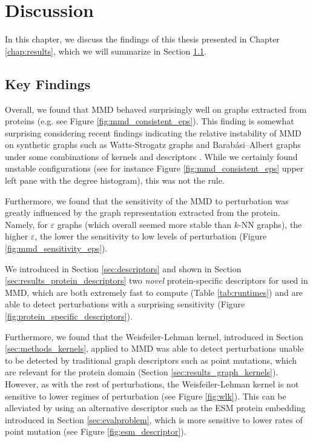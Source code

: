 \chapter{Discussion}\label{chap:discussion}

In this chapter, we discuss the findings of this thesis presented in Chapter
\ref{chap:results}, which we will summarize in Section \ref{sec:key_findings}.

\section{Key Findings}\label{sec:key_findings}

Overall, we found that MMD behaved surprisingly well on graphs extracted from
proteins (e.g. see Figure \ref{fig:mmd_consistent_eps}). This finding is
somewhat surprising considering recent findings indicating the relative
instability of MMD on synthetic graphs such as Watts-Strogatz graphs and
Barabási–Albert graphs under some combinations of kernels and descriptors
\citep{o2021evaluation}. While we certainly found unstable configurations
(see for instance Figure \ref{fig:mmd_consistent_eps} upper left pane with the degree histogram),
this was not the rule.

Furthermore, we found that the sensitivity of the MMD to perturbation was
greatly influenced by the graph representation extracted from the protein.
Namely, for $\varepsilon$ graphs (which overall seemed more stable than $k$-NN
graphs), the higher $\varepsilon$, the lower the sensitivity to low levels of
perturbation (Figure \ref{fig:mmd_sensitivity_eps}).

We introduced in Section \ref{sec:descriptors} and shown in Section
\ref{sec:results_protein_descriptors} two \emph{novel} protein-specific descriptors for
used in MMD, which are both extremely fast to compute (Table \ref{tab:runtimes})
and are able to detect perturbations with a surprising sensitivity (Figure
\ref{fig:protein_specific_descriptors}).

Furthermore, we found that the Weisfeiler-Lehman kernel, introduced in Section
\ref{sec:methods_kernels}, applied to MMD was able to detect perturbations
unable to be detected by traditional graph descriptors such as point mutations,
which are relevant for the protein domain (Section
\ref{sec:results_graph_kernels}). However, as with the rest of perturbations,
the Weisfeiler-Lehman kernel is not sensitive to lower regimes of perturbation
(see Figure \ref{fig:wlk}).
This can be alleviated by using an alternative descriptor such as the ESM
protein embedding introduced in Section \ref{sec:evalproblem}, which is more
sensitive to lower rates of point mutation (see Figure
\ref{fig:esm_descriptor}).

